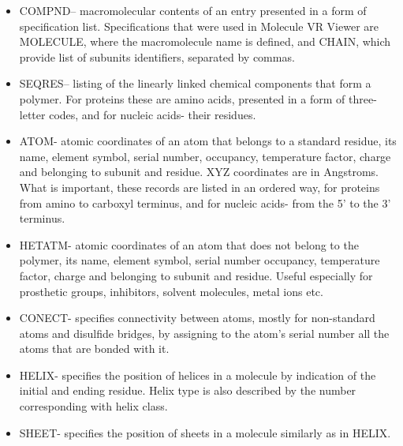 \begin{itemize}
\item COMPND– macromolecular contents of an entry presented in a form of specification list. Specifications that were used in Molecule VR Viewer are MOLECULE, where the macromolecule name is defined, and CHAIN, which provide list of subunits identifiers, separated by commas.
\item SEQRES– listing of the linearly linked chemical components that form a polymer. For proteins these are amino acids, presented in a form of three-letter codes, and for nucleic acids- their residues. 
\item ATOM- atomic coordinates of an atom that belongs to a standard residue, its name, element symbol, serial number, occupancy, temperature factor, charge and belonging to subunit and residue. XYZ coordinates are in Angstroms. What is important, these records are listed in an ordered way, for proteins from amino to carboxyl terminus, and for nucleic acids- from the 5' to the 3' terminus.
\item HETATM- atomic coordinates of an atom that does not belong to the polymer, its name, element symbol, serial number occupancy, temperature factor, charge and belonging to subunit and residue. Useful especially for prosthetic groups, inhibitors, solvent molecules, metal ions etc.
\item CONECT- specifies connectivity between atoms, mostly for non-standard atoms and disulfide bridges, by assigning to the atom's serial number all the atoms that are bonded with it. 
\item HELIX- specifies the position of helices in a molecule by indication of the initial and ending residue. Helix type is also described by the number corresponding with helix class.
\item SHEET- specifies the position of sheets in a molecule similarly as in HELIX.
\end{itemize}










